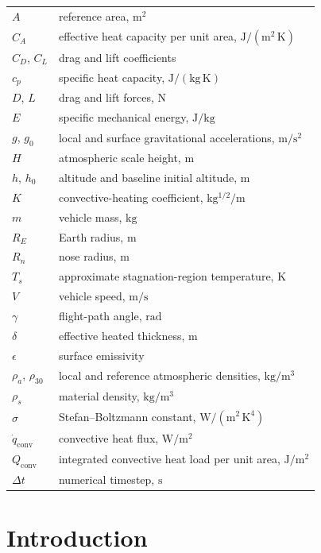 \documentclass[conf]{new-aiaa}
\begin{document}
{\renewcommand\arraystretch{1.0}
\noindent\begin{longtable}{@{}l @{\quad=\quad} l@{}}
$A$ & reference area, $\mathrm{m^2}$ \\
$C_A$ & effective heat capacity per unit area, $\mathrm{J/(m^2\,K)}$ \\
$C_D$, $C_L$ & drag and lift coefficients \\
$c_p$ & specific heat capacity, $\mathrm{J/(kg\,K)}$ \\
$D$, $L$ & drag and lift forces, $\mathrm{N}$ \\
$E$ & specific mechanical energy, $\mathrm{J/kg}$ \\
$g$, $g_0$ & local and surface gravitational accelerations, $\mathrm{m/s^2}$ \\
$H$ & atmospheric scale height, $\mathrm{m}$ \\
$h$, $h_0$ & altitude and baseline initial altitude, $\mathrm{m}$ \\
$K$ & convective-heating coefficient, $\mathrm{kg^{1/2}/m}$ \\
$m$ & vehicle mass, $\mathrm{kg}$ \\
$R_E$ & Earth radius, $\mathrm{m}$ \\
$R_n$ & nose radius, $\mathrm{m}$ \\
$T_s$ & approximate stagnation-region temperature, $\mathrm{K}$ \\
$V$ & vehicle speed, $\mathrm{m/s}$ \\
$\gamma$ & flight-path angle, $\mathrm{rad}$ \\
$\delta$ & effective heated thickness, $\mathrm{m}$ \\
$\epsilon$ & surface emissivity \\
$\rho_a$, $\rho_{30}$ & local and reference atmospheric densities, $\mathrm{kg/m^3}$ \\
$\rho_s$ & material density, $\mathrm{kg/m^3}$ \\
$\sigma$ & Stefan--Boltzmann constant, $\mathrm{W/(m^2\,K^4)}$ \\
$\dot q_{\mathrm{conv}}$ & convective heat flux, $\mathrm{W/m^2}$ \\
$Q_{\mathrm{conv}}$ & integrated convective heat load per unit area, $\mathrm{J/m^2}$ \\
$\Delta t$ & numerical timestep, $\mathrm{s}$
\end{longtable}}

\section{Introduction}
\end{document}
